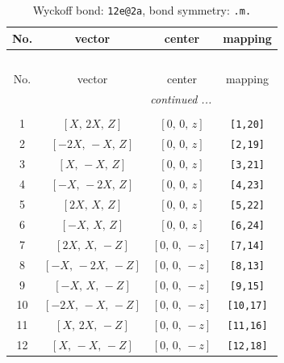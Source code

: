 \documentclass[fleqn,8pt]{jsarticle}
\begin{document}
\begin{longtable}{cccc}
\caption{Wyckoff bond: {\tt 12e@2a}, bond symmetry: {\tt .m.}}
 \\
 \hline \hline
No. & vector & center & mapping \\ \hline \endfirsthead

\multicolumn{3}{l}{\tablename\ \thetable{}} \\
 \hline \hline
No. & vector & center & mapping \\ \hline \endhead

 \hline \hline
\multicolumn{3}{r}{\footnotesize\it continued ...} \\ \endfoot

 \hline \hline
\multicolumn{3}{r}{} \\ \endlastfoot

1 & $\left[ X,\, 2 X,\, Z \right]$ & $\left[ 0,\, 0,\, z \right]$ & {\tt [1,20]} \\ \hline
2 & $\left[ - 2 X,\, - X,\, Z \right]$ & $\left[ 0,\, 0,\, z \right]$ & {\tt [2,19]} \\ \hline
3 & $\left[ X,\, - X,\, Z \right]$ & $\left[ 0,\, 0,\, z \right]$ & {\tt [3,21]} \\ \hline
4 & $\left[ - X,\, - 2 X,\, Z \right]$ & $\left[ 0,\, 0,\, z \right]$ & {\tt [4,23]} \\ \hline
5 & $\left[ 2 X,\, X,\, Z \right]$ & $\left[ 0,\, 0,\, z \right]$ & {\tt [5,22]} \\ \hline
6 & $\left[ - X,\, X,\, Z \right]$ & $\left[ 0,\, 0,\, z \right]$ & {\tt [6,24]} \\ \hline
7 & $\left[ 2 X,\, X,\, - Z \right]$ & $\left[ 0,\, 0,\, - z \right]$ & {\tt [7,14]} \\ \hline
8 & $\left[ - X,\, - 2 X,\, - Z \right]$ & $\left[ 0,\, 0,\, - z \right]$ & {\tt [8,13]} \\ \hline
9 & $\left[ - X,\, X,\, - Z \right]$ & $\left[ 0,\, 0,\, - z \right]$ & {\tt [9,15]} \\ \hline
10 & $\left[ - 2 X,\, - X,\, - Z \right]$ & $\left[ 0,\, 0,\, - z \right]$ & {\tt [10,17]} \\ \hline
11 & $\left[ X,\, 2 X,\, - Z \right]$ & $\left[ 0,\, 0,\, - z \right]$ & {\tt [11,16]} \\ \hline
12 & $\left[ X,\, - X,\, - Z \right]$ & $\left[ 0,\, 0,\, - z \right]$ & {\tt [12,18]} \\
\end{longtable}
\renewcommand{\arraystretch}{1.2}
\end{document}

